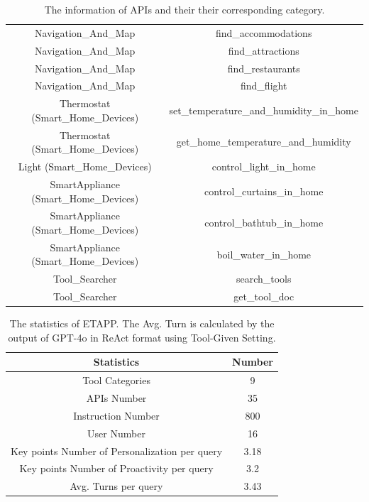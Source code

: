 \documentclass[11pt]{article}
\begin{document}
\begin{table}
{{\begin{tabular}{c|c}
Navigation\_And\_Map & find\_accommodations \\
Navigation\_And\_Map & find\_attractions \\
Navigation\_And\_Map & find\_restaurants \\
Navigation\_And\_Map & find\_flight \\
Thermostat (Smart\_Home\_Devices) & set\_temperature\_and\_humidity\_in\_home \\
Thermostat (Smart\_Home\_Devices) & get\_home\_temperature\_and\_humidity \\
Light (Smart\_Home\_Devices) & control\_light\_in\_home \\
SmartAppliance (Smart\_Home\_Devices) & control\_curtains\_in\_home \\
SmartAppliance (Smart\_Home\_Devices) & control\_bathtub\_in\_home \\
SmartAppliance (Smart\_Home\_Devices) & boil\_water\_in\_home \\
\midrule
Tool\_Searcher & search\_tools \\
Tool\_Searcher & get\_tool\_doc \\
\midrule
    \end{tabular}
    }
}
    \caption{The information of APIs and their their corresponding category.}
    \label{table:api_name}
\end{table}


\begin{table}[]
    \centering
    \begin{tabular}{c|c}
        \toprule
        Statistics & Number \\
        \toprule
        Tool Categories & 9 \\
        APIs Number & 35 \\
        Instruction Number & 800 \\
        User Number & 16 \\
        Key points Number of Personalization per query & 3.18 \\
        Key points Number of Proactivity per query & 3.2 \\
        Avg. Turns per query  & 3.43 \\
        \midrule
    \end{tabular}
    \caption{The statistics of ETAPP. The Avg. Turn is calculated by the output of GPT-4o in ReAct format using Tool-Given Setting.}
    \label{table:statistics}
\end{table}
\end{document}
